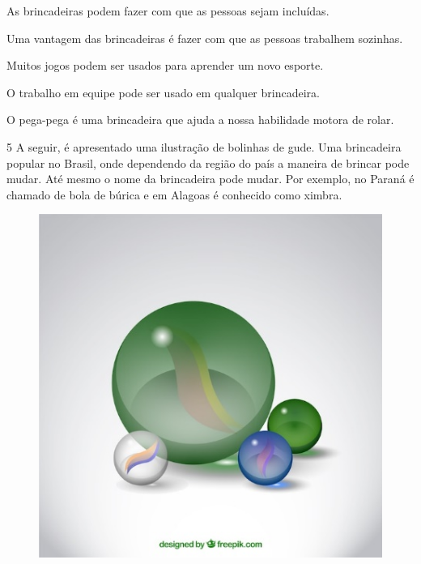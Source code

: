 \begin{boxlist}
\item As brincadeiras podem fazer com que as pessoas sejam incluídas. 

\item Uma vantagem das brincadeiras é fazer com que as pessoas trabalhem sozinhas. 

\item Muitos jogos podem ser usados para aprender um novo esporte. 

\item O trabalho em equipe pode ser usado em qualquer brincadeira. 

\item O pega-pega é uma brincadeira que ajuda a nossa habilidade motora de rolar. 
\end{boxlist}


\num{5} A seguir, é apresentado uma ilustração de bolinhas de gude. Uma
  brincadeira popular no Brasil, onde dependendo da região do país a
  maneira de brincar pode mudar. Até mesmo o nome da brincadeira pode
  mudar. Por exemplo, no Paraná é chamado de bola de búrica e em Alagoas
  é conhecido como ximbra.

\begin{figure}[htpb!]
\includegraphics[width=\textwidth]{./imgs/img10.jpg}
\end{figure}

